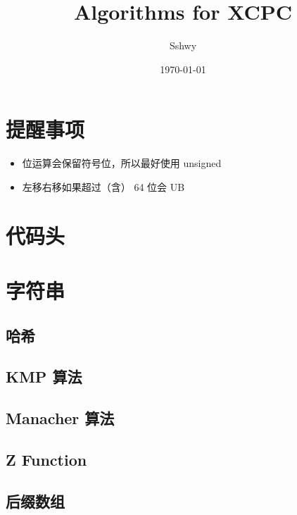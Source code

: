 \documentclass[a4paper,12pt]{article}
\begin{document}
\title{Algorithms for XCPC}
\author{Sshwy}
\date{\today}
\maketitle

\newpage

\tableofcontents
\newpage
{}

\section{提醒事项}

\begin{itemize}
    \item 位运算会保留符号位，所以最好使用 unsigned
    \item 左移右移如果超过（含） 64 位会 UB
\end{itemize}

\section{代码头}



\section{字符串}

\subsection{哈希}

\subsection{KMP 算法}

\subsection{Manacher 算法}

\subsection{Z Function}

\subsection{后缀数组}

\end{document}

